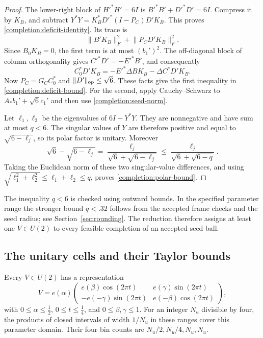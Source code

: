 \begin{proof}
The lower-right block of $H'^*H'=6I$ is
$B'^*B'+D'^*D'=6I$.  Compress it by $K_B$, and subtract
$Y^*Y=K_B^*D'^*(I-P_C)D'K_B$.  This proves
\eqref{completion:deficit-identity}.  Its trace is
\[
 \lVert B'K_B\rVert_F^2+\lVert P_CD'K_B\rVert_F^2.
\]
Since $B_0K_B=0$, the first term is at most $(b_1')^2$.
The off-diagonal block of column orthogonality gives
$C'^*D'=-E'^*B'$, and consequently
\[
 C_0^*D'K_B=-E'^*\Delta B K_B-\Delta C^*D'K_B.
\]
Now $P_C=G_CC_0^*$ and $\lVert D'\rVert_{\rm op}\le\sqrt6$.
These facts give the first inequality in \eqref{completion:deficit-bound}.
For the second, apply Cauchy--Schwarz to
$A_*b_1'+\sqrt6 c_1'$ and then use
\eqref{completion:seed-norm}.

Let $\ell_1,\ell_2$ be the eigenvalues of $6I-Y^*Y$.
They are nonnegative and have sum at most $q<6$.  The singular values of
$Y$ are therefore positive and equal to $\sqrt{6-\ell_j}$, so its polar
factor is unitary.  Moreover
\[
 \sqrt6-\sqrt{6-\ell_j}
 =\frac{\ell_j}{\sqrt6+\sqrt{6-\ell_j}}
 \le\frac{\ell_j}{\sqrt6+\sqrt{6-q}}.
\]
Taking the Euclidean norm of these two singular-value differences, and
using $\sqrt{\ell_1^2+\ell_2^2}\le\ell_1+\ell_2\le q$, proves
\eqref{completion:polar-bound}.
\end{proof}

The inequality $q<6$ is checked using outward bounds.  In the specified
parameter range the stronger bound $q<.32$ follows from the accepted frame
checks and the seed radius; see Section~\ref{sec:rounding}.  The reduction
therefore assigns at least one $V\in U(2)$ to every feasible completion of
an accepted seed ball.

\subsection{The unitary cells and their Taylor bounds}

\begin{lemma}
\label{completion:unitary-cover}
Every $V\in U(2)$ has a representation
\begin{equation}
\label{completion:unitary-parameterization}
 V=e(\alpha)
 \begin{pmatrix}
 e(\beta)\cos(2\pi t)&e(\gamma)\sin(2\pi t)\\
 -e(-\gamma)\sin(2\pi t)&e(-\beta)\cos(2\pi t)
 \end{pmatrix},
\end{equation}
with
$0\le\alpha\le\tfrac12$, $0\le t\le\tfrac14$, and
$0\le\beta,\gamma\le1$.
For an integer $N_u$ divisible by four, the products of closed intervals
of width $1/N_u$ in these ranges cover this parameter domain.  Their four
bin counts are $N_u/2,N_u/4,N_u,N_u$.
\end{lemma}

